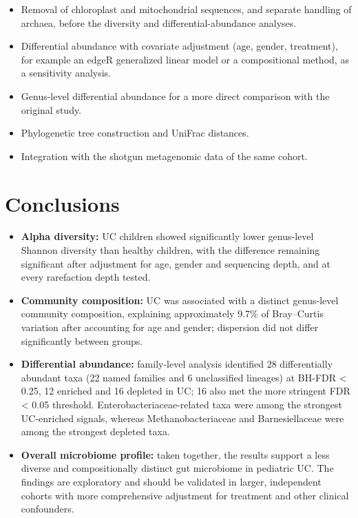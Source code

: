 \documentclass[
  letterpaper,
  DIV=11,
  numbers=noendperiod]{scrartcl}
\providecommand{\tightlist}{%
  \setlength{\itemsep}{0pt}\setlength{\parskip}{0pt}}
\begin{document}
\begin{itemize}
\tightlist
\item
  Removal of chloroplast and mitochondrial sequences, and separate
  handling of archaea, before the diversity and differential-abundance
  analyses.
\item
  Differential abundance with covariate adjustment (age, gender,
  treatment), for example an edgeR generalized linear model or a
  compositional method, as a sensitivity analysis.
\item
  Genus-level differential abundance for a more direct comparison with
  the original study.
\item
  Phylogenetic tree construction and UniFrac distances.
\item
  Integration with the shotgun metagenomic data of the same cohort.
\end{itemize}

\section{Conclusions}\label{conclusions}

\begin{itemize}
\tightlist
\item
  \textbf{Alpha diversity:} UC children showed significantly lower
  genus-level Shannon diversity than healthy children, with the
  difference remaining significant after adjustment for age, gender and
  sequencing depth, and at every rarefaction depth tested.
\item
  \textbf{Community composition:} UC was associated with a distinct
  genus-level community composition, explaining approximately 9.7\% of
  Bray--Curtis variation after accounting for age and gender; dispersion
  did not differ significantly between groups.
\item
  \textbf{Differential abundance:} family-level analysis identified 28
  differentially abundant taxa (22 named families and 6 unclassified
  lineages) at BH-FDR \textless{} 0.25, 12 enriched and 16 depleted in
  UC; 16 also met the more stringent FDR \textless{} 0.05 threshold.
  Enterobacteriaceae-related taxa were among the strongest UC-enriched
  signals, whereas Methanobacteriaceae and Barnesiellaceae were among
  the strongest depleted taxa.
\item
  \textbf{Overall microbiome profile:} taken together, the results
  support a less diverse and compositionally distinct gut microbiome in
  pediatric UC. The findings are exploratory and should be validated in
  larger, independent cohorts with more comprehensive adjustment for
  treatment and other clinical confounders.
\end{itemize}
\end{document}
